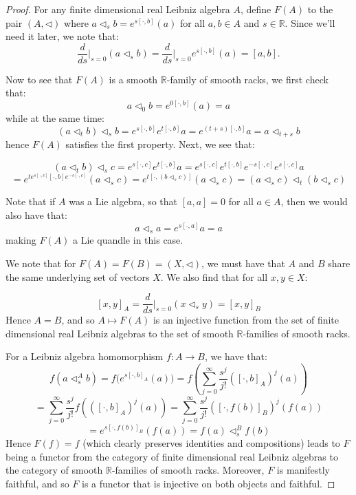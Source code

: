 \documentclass[10pt,a4paper]{amsart}
\begin{document}
\begin{proof}
 For any finite dimensional real Leibniz algebra $A$, define $F(A)$ to the pair $(A,\triangleleft)$ where $a\triangleleft_s b = e^{s [\cdot,b]}(a)$ for all $a,b \in A$ and $s \in \mathbb{R}$. Since we'll need it later, we note that: $$ \frac{d}{ds}\bigg|_{s=0} (a\triangleleft_s b) = \frac{d}{ds}\bigg|_{s=0} e^{s [\cdot,b]}(a) = [a,b].$$

Now to see that $F(A)$ is a smooth $\mathbb{R}$-family of smooth racks, we first check that:
$$  a\triangleleft_0 b = e^{0 [\cdot,b]}(a) = a  $$
while at the same time:
$$ (a \triangleleft_t b ) \triangleleft_s b  = e^{s [\cdot,b]}e^{t [\cdot,b]}a = e^{(t+s) [\cdot,b]}a = a \triangleleft_{t+s}b$$
hence $F(A)$ satisfies the first property. Next, we see that:

$$ (a \triangleleft_t b ) \triangleleft_s c =e^{s [\cdot,c]}e^{t [\cdot,b]}a=e^{s [\cdot,c]}e^{t [\cdot,b]}e^{-s [\cdot,c]}e^{s [\cdot,c]}a $$ $$=e^{t e^{s [\cdot,c]}[\cdot,b]e^{-s [\cdot,c]}} (a\triangleleft_s c) =e^{t [\cdot,(b\triangleleft_s c)]} (a\triangleleft_s c) =(a\triangleleft_s c) \triangleleft_t (b\triangleleft_s c) $$

Note that if $A$ was a Lie algebra, so that $[a,a]=0$ for all $a \in A$, then we would also have that:
$$ a \triangleleft_s a = e^{s[\cdot,a]}a = a  $$
making $F(A)$ a Lie quandle in this case.


We note that for $F(A)=F(B) =(X,\triangleleft)$, we must have that $A$ and $B$ share the same underlying set of vectors $X$. We also find that for all $x,y \in X$:

$$ [x,y]_A = \frac{d}{ds}\bigg|_{s=0} (x \triangleleft_s y) =   [x,y]_B$$
Hence $A=B$, and so $A \mapsto F(A)$ is an injective function from the set of finite dimensional real Leibniz algebras to the set of smooth $\mathbb{R}$-families of smooth racks. 

 For a Leibniz algebra homomorphism $f:A \to B$, we have that:
$$ f(a\triangleleft^A_s b) = f\big(  e^{s  [\cdot,b]_A}(a)\big)= f\left(  \sum_{j=0}^{\infty} \frac{s^j}{j!} ([\cdot,b]_A)^j(a)\right)$$
$$=  \sum_{j=0}^{\infty} \frac{s^j}{j!} f\left(  ([\cdot,b]_A)^j(a)\right)=  \sum_{j=0}^{\infty} \frac{s^j}{j!}   ([\cdot,f(b)]_B)^j(f(a)) $$ $$=  e^{s [\cdot,f(b)]_B}(f(a)) = f(a)\triangleleft^B_sf(b) $$
Hence $F(f)=f$ (which clearly preserves identities and compositions) leads to $F$ being a functor from the category of finite dimensional real Leibniz algebras to the category of smooth $\mathbb{R}$-families of smooth racks. Moreover, $F$ is manifestly faithful, and so $F$ is a functor that is injective on both objects and faithful.
\end{proof}
\end{document}
